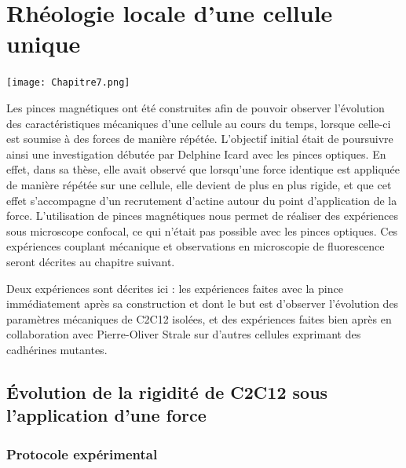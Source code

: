 %
%

\chapter{Rhéologie locale d'une cellule unique}
\begin{center}
\texttt{[image: Chapitre7.png]}

\end{center}
\newpage

Les pinces magnétiques ont été construites afin de pouvoir observer l'évolution des caractéristiques mécaniques d'une cellule au cours du temps, lorsque celle-ci est soumise à des forces de manière répétée. L'objectif initial était de poursuivre ainsi une investigation débutée par Delphine Icard avec les pinces optiques. En effet, dans sa thèse, elle avait observé que lorsqu'une force identique est appliquée de manière répétée sur une cellule, elle devient de plus en plus rigide, et que cet effet s'accompagne d'un recrutement d'actine autour du point d'application de la force. L'utilisation de pinces magnétiques nous permet de réaliser des expériences sous microscope confocal, ce qui n'était pas possible avec les pinces optiques. Ces expériences couplant mécanique et observations en microscopie de fluorescence seront décrites au chapitre suivant. 

Deux expériences sont décrites ici : les expériences faites avec la pince immédiatement après sa construction et dont le but est d'observer l'évolution des paramètres mécaniques de C2C12 isolées, et des expériences faites bien après en collaboration avec Pierre-Oliver Strale sur d'autres cellules exprimant des cadhérines mutantes. 

\section{\'Evolution de la rigidité de C2C12 sous l'application d'une force}

\subsection{Protocole expérimental}

